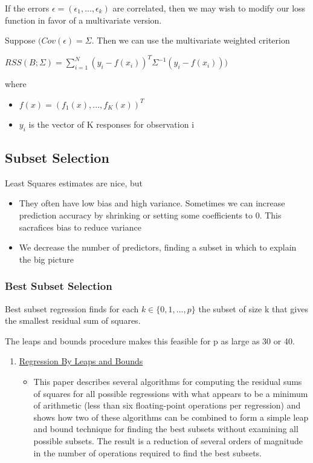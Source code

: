 \documentclass[11pt]{article}
\begin{document}
If the errors \(\epsilon = (\epsilon_1, ..., \epsilon_k)\) are correlated, then we may wish to modify our loss function in favor of a multivariate version.

Suppose \((Cov(\epsilon) = \Sigma\). Then we can use the multivariate weighted criterion 

\(RSS(B; \Sigma) = \sum_{i=1}^N(y_i - f(x_i))^T\Sigma^{-1}(y_i - f(x_i)))\)

where 

\begin{itemize}
\item \(f(x) = (f_1(x), ..., f_K(x))^T\)
\item \(y_i\) is the vector of K responses for observation i
\end{itemize}
\subsection{Subset Selection}
\label{sec:org0446dc7}

Least Squares estimates are nice, but

\begin{itemize}
\item They often have low bias and high variance. Sometimes we can increase prediction accuracy by shrinking or setting some coefficients to 0. This sacrafices bias to reduce variance
\item We decrease the number of predictors, finding a subset in which to explain the big picture
\end{itemize}

\subsubsection{Best Subset Selection}
\label{sec:orgd463abb}

Best subset regression finds for each \(k \in \{0, 1, ..., p\}\) the subset of size k that gives the smallest residual sum of squares.

The leaps and bounds procedure makes this feasible for p as large as 30 or 40.

\begin{enumerate}
\item \href{https://colinpriestdotcom.files.wordpress.com/2015/07/leapsandbounds.pdf}{Regression By Leaps and Bounds}
\label{sec:org9bbd804}
\begin{itemize}
\item This paper describes several algorithms for computing the
residual sums of squares for all possible regressions with
what appears to be a minimum of arithmetic (less than six
floating-point operations per regression) and shows how two
of these algorithms can be combined to form a simple leap and
bound technique for finding the best subsets without
examining all possible subsets. The result is a reduction of
several orders of magnitude in the number of operations
required to find the best subsets.
\end{itemize}
\end{enumerate}
\end{document}
